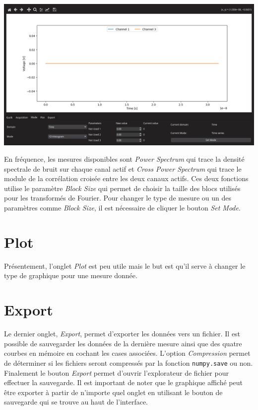 \documentclass[openright,letterpaper,12pt]{book}
\begin{document}
\begin{center}
		\includegraphics[width=\textwidth]{Figures/Mode.png}
\end{center}\vspace{1cm}

En fréquence, les mesures disponibles sont \textit{Power Spectrum} qui trace 
la densité spectrale de bruit sur chaque canal actif et \textit{Cross Power 
Spectrum} qui trace le module de la corrélation croisée entre les deux canaux 
actifs. 
Ces deux fonctions utilise le paramètre \textit{Block Size} qui permet de 
choisir la taille des blocs utilisés pour les transformés de Fourier. 
Pour changer le type de mesure ou un des paramètres comme \textit{Block Size}, 
il est nécessaire de cliquer le bouton \textit{Set Mode}.\clearpage

\section*{Plot}\vspace{1cm}

Présentement, l'onglet \textit{Plot} est peu utile mais le but est qu'il serve 
à changer le type de graphique pour une mesure donnée.

\section*{Export}\vspace{1cm}

Le dernier onglet, \textit{Export}, permet d'exporter les données vers un 
fichier. 
Il est possible de sauvegarder les données de la dernière mesure ainsi que des 
quatre courbes en mémoire en cochant les cases associées. 
L'option \textit{Compression} permet de déterminer si les fichiers seront 
compressés par la fonction \verb+numpy.save+ ou non. 
Finalement le bouton \textit{Export} permet d'ouvrir l'explorateur de fichier 
pour effectuer la sauvegarde. 
Il est important de noter que le graphique affiché peut être exporter à partir 
de n'importe quel onglet en utilisant le bouton de sauvegarde qui se trouve au 
haut de l'interface.\vspace{1cm}
\end{document}
